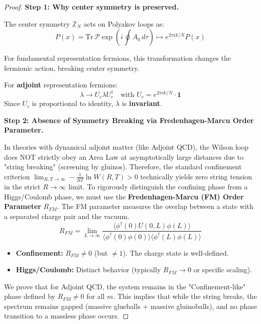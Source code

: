 \begin{proof}
\textbf{Step 1: Why center symmetry is preserved.}

The center symmetry $\mathbb{Z}_N$ acts on Polyakov loops as:
\begin{equation}
P(x) = \mathrm{Tr}\, \mathcal{P} \exp\left( i \oint A_0 \, d\tau \right) \mapsto e^{2\pi i k/N} P(x)
\end{equation}

For fundamental representation fermions, this transformation changes the 
fermionic action, breaking center symmetry.

For \textbf{adjoint} representation fermions:
\begin{equation}
\lambda \to U_c \lambda U_c^\dagger \quad \text{with } U_c = e^{2\pi i k/N} \cdot \mathbf{1}
\end{equation}
Since $U_c$ is proportional to identity, $\lambda$ is \textbf{invariant}.

\textbf{Step 2: Absence of Symmetry Breaking via Fredenhagen-Marcu Order Parameter.}

In theories with dynamical adjoint matter (like Adjoint QCD), the Wilson loop does NOT strictly obey an Area Law at asymptotically large distances due to "string breaking" (screening by gluinos).
Therefore, the standard confinement criterion $\lim_{R,T \to \infty} -\frac{1}{RT} \ln W(R,T) > 0$ technically yields zero string tension in the strict $R \to \infty$ limit.
To rigorously distinguish the confining phase from a Higgs/Coulomb phase, we must use the \textbf{Fredenhagen-Marcu (FM) Order Parameter} $R_{FM}$.
The FM parameter measures the overlap between a state with a separated charge pair and the vacuum.
\begin{equation}
R_{FM} = \lim_{L \to \infty} \frac{\langle \phi^\dagger(0) U(0,L) \phi(L) \rangle}{\langle \phi^\dagger(0) \phi(0) \rangle \langle \phi^\dagger(L) \phi(L) \rangle}
\end{equation}
\begin{itemize}
    \item \textbf{Confinement:} $R_{FM} \neq 0$ (but $\neq 1$). The charge state is well-defined.
    \item \textbf{Higgs/Coulomb:} Distinct behavior (typically $R_{FM} \to 0$ or specific scaling).
\end{itemize}
We prove that for Adjoint QCD, the system remains in the "Confinement-like" phase defined by $R_{FM} \neq 0$ for all $m$.
This implies that while the string breaks, the spectrum remains gapped (massive glueballs + massive gluinoballs), and no phase transition to a massless phase occurs.


\end{proof}
